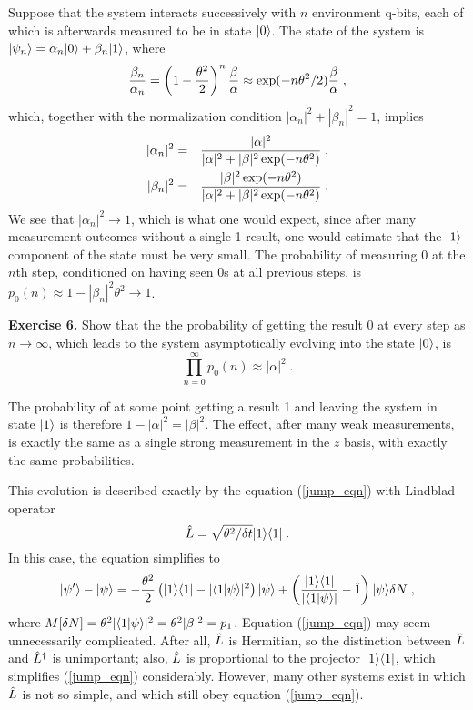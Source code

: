 Suppose that the system interacts successively with $n$ environment
q-bits, each of which is afterwards measured to be in state ${| 0 \rangle}$.
The state of the system is ${| \psi_n \rangle} = \alpha_n{| 0 \rangle} + \beta_n{| 1 \rangle}$,
where
\begin{equation}
{\beta_n\over\alpha_n} =
  \left( 1 - {\theta^2\over2} \right)^n
  {\beta\over\alpha} \approx
  \exp( - n\theta^2/2) {\beta\over\alpha} \;,
\end{equation}
which, together with the normalization condition
$|\alpha_n|^2+|\beta_n|^2=1$, implies
\begin{eqnarray}
|\alpha_n|^2
  &=& {|\alpha|^2\over |\alpha|^2
 + |\beta|^2\exp(-n\theta^2) } \;, \nonumber\\
|\beta_n|^2
  &=& {|\beta|^2\exp(-n\theta^2)\over |\alpha|^2
 + |\beta|^2\exp(-n\theta^2) } \;.
\label{asymptotic_jump}
\end{eqnarray}
We see that $|\alpha_n|^2 \rightarrow 1$, which is what one would expect,
since after many measurement outcomes without a single 1 result, one would
estimate that the ${| 1 \rangle}$ component of the state must be very small.
The probability of measuring 0 at the $n$th step, conditioned on having
seen 0s at all previous steps,
is $p_0(n) \approx 1 - |\beta_n|^2\theta^2 \rightarrow 1$.

\medskip\noindent
{\bf Exercise 6.} Show that the the probability of getting the result 0 at
every step as $n\rightarrow\infty$, which leads to the system asymptotically
evolving into the state ${| 0 \rangle}$, is
\begin{equation}
\prod_{n=0}^\infty p_0(n) \approx |\alpha|^2 \;.
\end{equation}
\medskip

The probability of at some point getting a result 1 and leaving the
system in state ${| 1 \rangle}$ is therefore $1-|\alpha|^2 = |\beta|^2$.
The effect, after many weak measurements, is exactly the same as a single
strong measurement in the $z$ basis, with exactly the same probabilities.

This evolution is described exactly by the equation (\ref{jump_eqn})
with Lindblad operator
\begin{equation}
{\hat L} = \sqrt{\theta^2/\delta t} {| 1 \rangle}{\langle 1 |} \;.
\label{CNOTlindblad}
\end{equation}
In this case, the equation simplifies to
\begin{equation}
{| \psi' \rangle}-{| \psi \rangle} = -{\theta^2\over2}
  \left( {| 1 \rangle}{\langle 1 |} - |{\langle 1 | \psi \rangle}|^2 \right) {| \psi \rangle}
  + \left( {{| 1 \rangle}{\langle 1 |}\over|{\langle 1 | \psi \rangle}|}
  - {\hat 1} \right){| \psi \rangle} \delta N \;,
\end{equation}
where $M[\delta N] = \theta^2 |{\langle 1 | \psi \rangle}|^2 = \theta^2|\beta|^2 = p_1$.
Equation (\ref{jump_eqn}) may seem unnecessarily
complicated.  After all, ${\hat L}$ is Hermitian, so the distinction between
${\hat L}$ and ${\hat L^\dagger}$ is unimportant; also, ${\hat L}$ is proportional to the
projector ${| 1 \rangle}{\langle 1 |}$, which simplifies (\ref{jump_eqn}) considerably.
However, many other systems exist in which ${\hat L}$ is not so simple, and
which still obey equation (\ref{jump_eqn}).

